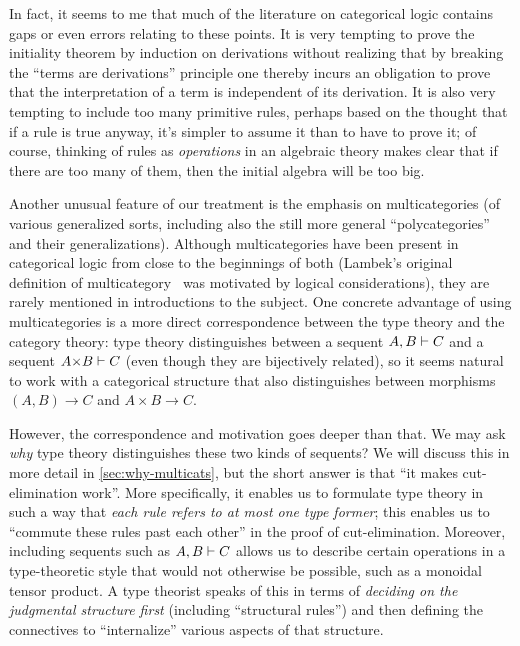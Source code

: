 In fact, it seems to me that much of the literature on categorical logic contains gaps or even errors relating to these points.
It is very tempting to prove the initiality theorem by induction on derivations without realizing that by breaking the ``terms are derivations'' principle one thereby incurs an obligation to prove that the interpretation of a term is independent of its derivation.
It is also very tempting to include too many primitive rules, perhaps based on the thought that if a rule is true anyway, it's simpler to assume it than to have to prove it; of course, thinking of rules as \emph{operations} in an algebraic theory makes clear that if there are too many of them, then the initial algebra will be too big.

Another unusual feature of our treatment is the emphasis on multicategories (of various generalized sorts, including also the still more general ``polycategories'' and their generalizations).
Although multicategories have been present in categorical logic from close to the beginnings of both (Lambek's original definition of multicategory~\cite{lambek:dedsys-ii} was motivated by logical considerations), they are rarely mentioned in introductions to the subject.
One concrete advantage of using multicategories is a more direct correspondence between the type theory and the category theory: type theory distinguishes between a sequent $A,B\vdash C$ and a sequent $A\times B\types C$ (even though they are bijectively related), so it seems natural to work with a categorical structure that also distinguishes between morphisms $(A,B)\to C$ and $A\times B\to C$.

However, the correspondence and motivation goes deeper than that.
We may ask \emph{why} type theory distinguishes these two kinds of sequents?
We will discuss this in more detail in \cref{sec:why-multicats}, but the short answer is that ``it makes cut-elimination work''.
More specifically, it enables us to formulate type theory in such a way that \emph{each rule refers to at most one type former}; this enables us to ``commute these rules past each other'' in the proof of cut-elimination.
Moreover, including sequents such as $A,B\vdash C$ allows us to describe certain operations in a type-theoretic style that would not otherwise be possible, such as a monoidal tensor product.
A type theorist speaks of this in terms of \emph{deciding on the judgmental structure first} (including ``structural rules'') and then defining the connectives to ``internalize'' various aspects of that structure.

